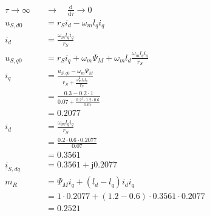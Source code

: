 \documentclass[11pt,a4paper]{scrartcl}
\newcommand{\mybr}[1]{\left(#1\right)}
\renewcommand{\j}{\mathrm{j}}
\renewcommand{\i}{\underline{i}}
\newcommand{\0}{_{\mybr{0}}}
\newcommand{\1}{_{\mybr{1}}}
\newcommand{\2}{_{\mybr{2}}}
\renewcommand{\d}{\mathrm{d}}
\newcommand{\isdq}{\i_{S,dq}}
\begin{document}
\subsection{}
\begin{align}
\tau\rightarrow\infty\quad&\rightarrow\quad \frac{\d}{\d\tau}\rightarrow 0\\
u_{S,d0}&=r_S i_d-\omega_m l_q i_q\\
i_d&=\frac{\omega_m l_q i_q}{r_S}\\
u_{S,q0}&=r_S i_q+\omega_m \Psi_M +\omega_m l_d \frac{\omega_m l_q i_q}{r_S}\\
i_q&=\frac{u_{S,q0}-\omega_m \Psi_M}{r_S+\frac{\omega_m^2 l_d l_q}{r_S}}\\
&=\frac{\num{0.3}-\num{0.2}\cdot 1}{\num{0.07}+\frac{\num{0.2}^2\cdot\num{1.2}\cdot\num{0.6}}{0.07}}\\
&=\num{0.2077}\\
i_d&=\frac{\omega_m l_q i_q}{r_S}\\
&=\frac{\num{0.2}\cdot\num{0.6}\cdot\num{0.2077}}{0.07}\\
&=\num{0.3561}\\
\isdq&=\num{0.3561}+\j\num{0.2077}\\
m_R&=\Psi_M i_q +\mybr{l_d - l_q} i_d i_q\\
&=1\cdot\num{0.2077}+\mybr{\num{1.2}-\num{0.6}}\cdot\num{0.3561}\cdot\num{0.2077}\\
&=\num{0.2521}
\end{align}

\end{document}
